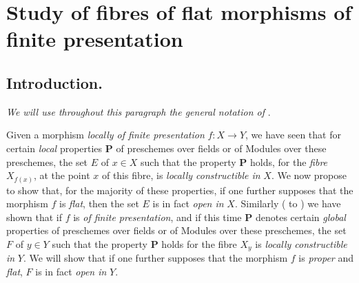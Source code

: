 
\section{Study of fibres of flat morphisms of finite presentation}
\label{section:IV.12}

\setcounter{subsection}{-1}
\subsection{Introduction.}
\label{subsection:IV.12.0}

\emph{We will use throughout this paragraph the general notation of} .

\begin{env}[12.0.1]
\label{IV.12.0.1}
Given a morphism \emph{locally of finite presentation} $f:X\to Y$, we have seen  that for certain \emph{local} properties $\boldsymbol{P}$ of preschemes over fields or of Modules over these preschemes, the set $E$ of $x\in X$ such that the property $\boldsymbol{P}$ holds, for the \emph{fibre} $X_{f(x)}$, at the point $x$ of this fibre, is \emph{locally constructible in} $X$.
We now propose to show that, for the majority of these properties, if one further supposes that the morphism $f$ is \emph{flat}, then the set $E$ is in fact \emph{open in} $X$.
Similarly ( to ) we have shown that if $f$ is \emph{of finite presentation}, and if this time $\boldsymbol{P}$ denotes certain \emph{global} properties of preschemes over fields or of Modules over these preschemes, the set $F$ of $y\in Y$ such that the property $\boldsymbol{P}$ holds for the fibre $X_y$ is \emph{locally constructible in} $Y$.
We will show that if one further supposes that the morphism $f$ is \emph{proper} and \emph{flat}, $F$ is in fact \emph{open in} $Y$.
\end{env}

